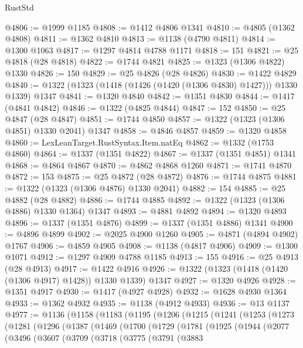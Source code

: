\begin{lexlean}{RustStd}
\begin{coremodule}
@4806 := @1999 @1185
@4808 := @1412 @4806 @1341
@4810 := @4805 (@1362 @4808)
@4811 := @1362 @4810
@4813 := @1138 (@4790 @4811)
@4814 := @1300 @1063
@4817 := @1297 @4814 @4788 @1171
@4818 := 151
@4821 := @25 @4818 (@28 @4818)
@4822 := @1744 @4821
@4825 := @1323 (@1306 @4822) @1330
@4826 := 150
@4829 := @25 @4826 (@28 @4826)
@4830 := @1422 @4829
@4840 := @1322 (@1323 (@1418 (@1426 (@1420 (@1306 @4830) @1427))) @1330 @1339) @1347
@4841 := @1320 @4840
@4842 := @1351 @4830
@4844 := @1417 (@4841 @4842)
@4846 := @1322 (@4825 @4844)
@4847 := 152
@4850 := @25 @4847 (@28 @4847)
@4851 := @1744 @4850
@4857 := @1322 (@1323 (@1306 @4851) @1330 @2041) @1347
@4858 := @4846 @4857
@4859 := @1320 @4858
@4860 := LexLeanTarget.RustSyntax.Item.natEq
@4862 := @1332 (@1753 @4860)
@4864 := @1337 (@1351 @4822)
@4867 := @1337 (@1351 @4851) @1341
@4868 := @4864 @4867
@4870 := @4862 @4868 @1260
@4871 := @1741 @4870
@4872 := 153
@4875 := @25 @4872 (@28 @4872)
@4876 := @1744 @4875
@4881 := @1322 (@1323 (@1306 @4876) @1330 @2041)
@4882 := 154
@4885 := @25 @4882 (@28 @4882)
@4886 := @1744 @4885
@4892 := @1322 (@1323 (@1306 @4886) @1330 @1364) @1347
@4893 := @4881 @4892
@4894 := @1320 @4893
@4896 := @1337 (@1351 @4876)
@4899 := @1337 (@1351 @4886) @1341
@4900 := @4896 @4899
@4902 := @2025 @4900 @1260
@4905 := @4871 (@4894 @4902) @1767
@4906 := @4859 @4905
@4908 := @1138 (@4817 @4906)
@4909 := @1300 @1071
@4912 := @1297 @4909 @4788 @1185
@4913 := 155
@4916 := @25 @4913 (@28 @4913)
@4917 := @1422 @4916
@4926 := @1322 (@1323 (@1418 (@1420 (@1306 @4917) @1428)) @1330 @1339) @1347
@4927 := @1320 @4926
@4928 := @1351 @4917
@4930 := @1417 (@4927 @4928)
@4932 := @1628 @4930 @1364
@4933 := @1362 @4932
@4935 := @1138 (@4912 @4933)
@4936 := @13 @1137
@4977 := @1136
    (@1158
      (@1183
        (@1195
          (@1206
            (@1215
              (@1241
                (@1253
                  (@1273
                    (@1281
                      (@1296
                        (@1387
                          (@1469
                            (@1700
                              (@1729
                                (@1781
                                  (@1925
                                    (@1944
                                      (@2077
                                        (@3496
                                          (@3607
                                            (@3709
                                              (@3718
                                                (@3775
                                                  (@3791
                                                    (@3883

\end{coremodule}
\end{lexlean}
